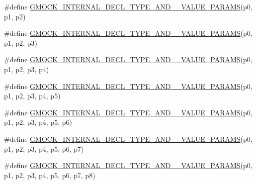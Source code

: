 \begin{DoxyCompactItemize}
\item 
\#define \mbox{\hyperlink{_obj__test_2lib_2googletest-release-1_88_81_2googlemock_2include_2gmock_2gmock-generated-actions_8h_a2def1ab63696280e9b8c20ed176d0c92}{G\+M\+O\+C\+K\+\_\+\+I\+N\+T\+E\+R\+N\+A\+L\+\_\+\+D\+E\+C\+L\+\_\+\+T\+Y\+P\+E\+\_\+\+A\+N\+D\+\_\+\_\+\+V\+A\+L\+U\+E\+\_\+\+P\+A\+R\+A\+MS}}(p0,  p1,  p2)
\item 
\#define \mbox{\hyperlink{_obj__test_2lib_2googletest-release-1_88_81_2googlemock_2include_2gmock_2gmock-generated-actions_8h_aff64ba07ea8171eb7bacb655127120f7}{G\+M\+O\+C\+K\+\_\+\+I\+N\+T\+E\+R\+N\+A\+L\+\_\+\+D\+E\+C\+L\+\_\+\+T\+Y\+P\+E\+\_\+\+A\+N\+D\+\_\+\_\+\+V\+A\+L\+U\+E\+\_\+\+P\+A\+R\+A\+MS}}(p0,  p1,  p2,  p3)
\item 
\#define \mbox{\hyperlink{_obj__test_2lib_2googletest-release-1_88_81_2googlemock_2include_2gmock_2gmock-generated-actions_8h_a1f0b43fe98dabf52fa9dbffa0966d7f3}{G\+M\+O\+C\+K\+\_\+\+I\+N\+T\+E\+R\+N\+A\+L\+\_\+\+D\+E\+C\+L\+\_\+\+T\+Y\+P\+E\+\_\+\+A\+N\+D\+\_\+\_\+\+V\+A\+L\+U\+E\+\_\+\+P\+A\+R\+A\+MS}}(p0,  p1,  p2,  p3,  p4)
\item 
\#define \mbox{\hyperlink{_obj__test_2lib_2googletest-release-1_88_81_2googlemock_2include_2gmock_2gmock-generated-actions_8h_abffe20cc195c1f2a1682878bb7f7a35d}{G\+M\+O\+C\+K\+\_\+\+I\+N\+T\+E\+R\+N\+A\+L\+\_\+\+D\+E\+C\+L\+\_\+\+T\+Y\+P\+E\+\_\+\+A\+N\+D\+\_\+\_\+\+V\+A\+L\+U\+E\+\_\+\+P\+A\+R\+A\+MS}}(p0,  p1,  p2,  p3,  p4,  p5)
\item 
\#define \mbox{\hyperlink{_obj__test_2lib_2googletest-release-1_88_81_2googlemock_2include_2gmock_2gmock-generated-actions_8h_acb3b2a137310a0ac944d3695a0911a64}{G\+M\+O\+C\+K\+\_\+\+I\+N\+T\+E\+R\+N\+A\+L\+\_\+\+D\+E\+C\+L\+\_\+\+T\+Y\+P\+E\+\_\+\+A\+N\+D\+\_\+\_\+\+V\+A\+L\+U\+E\+\_\+\+P\+A\+R\+A\+MS}}(p0,  p1,  p2,  p3,  p4,  p5,  p6)
\item 
\#define \mbox{\hyperlink{_obj__test_2lib_2googletest-release-1_88_81_2googlemock_2include_2gmock_2gmock-generated-actions_8h_af6338728a5c12281280830ec7c5f685a}{G\+M\+O\+C\+K\+\_\+\+I\+N\+T\+E\+R\+N\+A\+L\+\_\+\+D\+E\+C\+L\+\_\+\+T\+Y\+P\+E\+\_\+\+A\+N\+D\+\_\+\_\+\+V\+A\+L\+U\+E\+\_\+\+P\+A\+R\+A\+MS}}(p0,  p1,  p2,  p3,  p4,  p5,  p6,  p7)
\item 
\#define \mbox{\hyperlink{_obj__test_2lib_2googletest-release-1_88_81_2googlemock_2include_2gmock_2gmock-generated-actions_8h_a27e84307ea95be9e2e4526cd6b34a151}{G\+M\+O\+C\+K\+\_\+\+I\+N\+T\+E\+R\+N\+A\+L\+\_\+\+D\+E\+C\+L\+\_\+\+T\+Y\+P\+E\+\_\+\+A\+N\+D\+\_\+\_\+\+V\+A\+L\+U\+E\+\_\+\+P\+A\+R\+A\+MS}}(p0,  p1,  p2,  p3,  p4,  p5,  p6,  p7,  p8)

\end{DoxyCompactItemize}
